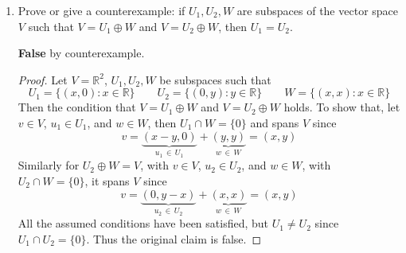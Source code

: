 \documentclass[12pt]{article}
\newcommand{\R}{\mathbb{R}}
\begin{document}
\begin{enumerate}
\begin{enumerate}
\begin{mybox}
\begin{proof}
            $$v = \begin{bmatrix} v_1 & v_2 \\ v_3 & v_4 \end{bmatrix} = \begin{bmatrix} a + d & -a+e \\ b-d & c+f \end{bmatrix} = w_1 + w_2$$ 
            Therefore,
            $$v_1 = a+d \qquad v_2 = -a + e \qquad v_3 = b-d \qquad v_4 = c+f$$
            Let $d = f = 0$ then,
            $$v_1 = a \qquad v_2 = -a + e \qquad v_3 = b \qquad v_4 = c$$
            Solving for $a,b,c,d,e,f$ in terms of $v_1, v_2, v_3, v_4$, we get
            $$a = v_1 \qquad b = v_3 \qquad c = v_4 \qquad d = 0 \qquad e = v_1 + v_2 \qquad f = 0$$
            From the equations, $v = w_1 + w_2 \,\,\forall\,\,v \in V,\, w_1 \in W_1, \, w_2 \in W_2$. Thus $V \subseteq W_1 + W_2$.
            Since $w_1, w_2 \in V$ by definition of subset, then \\$w_1 + w_2 \in V \, \therefore \, W_1 + W_2 \subseteq V$.   \\\\Hence, $W_1 + W_2 = V$\end{proof}
      \end{mybox}
      \end{enumerate}
\newpage
\item  Prove or give a counterexample:  if $U_1, U_2,W$ are subspaces of the vector space $V$ such that $V = U_1 \oplus W$ and $V = U_2 \oplus W$, then $U_1 = U_2$.
\begin{mybox}
    \textbf{False} by counterexample.
    \begin{proof}
     Let $V = \R^2$, $U_1, U_2, W$ be subspaces such that\\
     $$U_1 = \{(x,0) : x\in \R \} \qquad U_2 = \{(0,y) : y\in \R \} \qquad W = \{(x,x) : x\in \R \}$$
     Then the condition that
     $V = U_1 \oplus W $ and $ V = U_2 \oplus W$ holds. To show that, let $v \in V$, $u_1 \in U_1$, and $w \in W$, then $U_1 \cap W = \{0\}$ and spans $V$ since
     $$v = \underbrace{(x-y,0)}_{u_1\,\in\, U_1} + \underbrace{(y, y)}_{w\,\in\, W} = (x,y)$$
     Similarly for $U_2 \oplus W = V$, with $v \in V$, $u_2 \in U_2$, and $w \in W$, with $U_2 \cap W = \{0\}$, it spans $V$ since
     $$v = \underbrace{(0, y-x)}_{u_2 \,\in\, U_2} + \underbrace{(x, x)}_{w\,\in\, W} = (x,y)$$
     All the assumed conditions have been satisfied, but $U_1 \neq U_2$ since $U_1 \cap U_2 = \{0\}$. Thus the original claim is false.
    \end{proof}

\end{mybox}
\end{enumerate}
\end{document}
